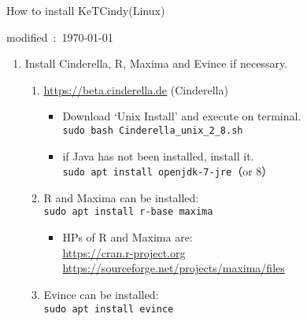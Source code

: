 \documentclass{article}
\begin{document}
\begin{center}
How to install KeTCindy(Linux)
\end{center}

\hfill modified\ :\ \today

\begin{enumerate}[\bf\large 1.]

\item Install Cinderella, R, Maxima and Evince if necessary.
    \begin{enumerate}[(1)]
    \item \url{https://beta.cinderella.de}  (Cinderella)
      \begin{itemize}
      \item Download `Unix Install' and execute on terminal.\\
      \hspace*{10mm}\verb|sudo bash Cinderella_unix_2_8.sh|
      \item if Java has not been installed, install it.\\
      \hspace*{10mm}\verb|sudo apt install openjdk-7-jre|（or 8）
      \end{itemize}
   \item R and Maxima can be installed:\\
   \hspace*{10mm}\verb|sudo apt install r-base maxima|
    \begin{itemize}
    \item HPs of R and Maxima are:\\
    \hspace*{10mm}\url{https://cran.r-project.org}\\
    \hspace*{10mm}\url{https://sourceforge.net/projects/maxima/files}
    \end{itemize}
   \item Evince can be installed:\\
   \hspace*{10mm}\verb|sudo apt install evince|
    \end{enumerate}


\end{enumerate}
\end{document}
